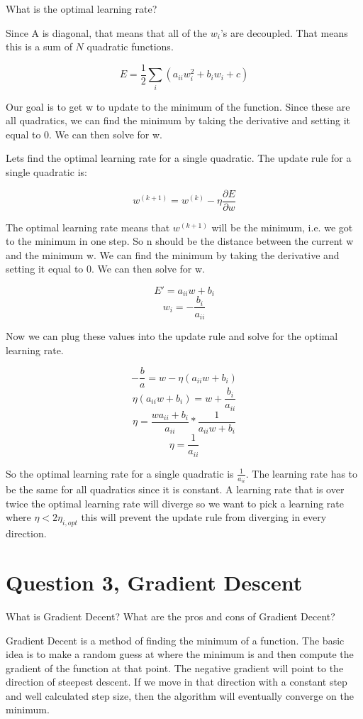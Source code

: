 \documentclass{article}
\begin{document}
What is the optimal learning rate?

Since A is diagonal, that means that all of the $w_i$'s are decoupled. That means this is a sum of $N$ quadratic functions.

$$ E = \frac{1}{2}\sum_{i}(a_{ii}w_i^2 + b_iw_i + c) $$

Our goal is to get w to update to the minimum of the function. Since these are all quadratics, we can find the minimum by taking the derivative and setting it equal to 0. We can then solve for w.

Lets find the optimal learning rate for a single quadratic. The update rule for a single quadratic is:

$$ w^{(k+1)} = w^{(k)} - \eta \frac{\partial E}{\partial w} $$

The optimal learning rate means that $w^{(k+1)}$ will be the minimum, i.e. we got to the minimum in one step. So n should be the distance between the current w and the minimum w. We can find the minimum by taking the derivative and setting it equal to 0. We can then solve for w.

$$ E' = a_{ii}w + b_i $$
$$ w_i = -\frac{b_i}{a_{ii}} $$

Now we can plug these values into the update rule and solve for the optimal learning rate.

$$ -\frac{b}{a} = w - \eta (a_{ii}w + b_{i}) $$
$$ \eta(a_{ii}w + b_{i}) = w + \frac{b_i}{a_{ii}} $$
$$ \eta = \frac{wa_{ii} + b_i}{a_{ii}} * \frac{1}{a_{ii}w + b_{i}} $$
$$ \eta = \frac{1}{a_{ii}}$$

So the optimal learning rate for a single quadratic is $\frac{1}{a_{ii}}$. The learning rate has to be the same for all quadratics since it is constant. A learning rate that is over twice the optimal learning rate will diverge so we want to pick a learning rate where $\eta < 2 \eta_{i,opt}$ this will prevent the update rule from diverging in every direction.


\section*{Question 3, Gradient Descent}

What is Gradient Decent? What are the pros and cons of Gradient Decent?

Gradient Decent is a method of finding the minimum of a function. The basic idea is to make a random guess at where the minimum is and then compute the gradient of the function at that point. The negative gradient will point to the direction of steepest descent. If we move in that direction with a constant step and well calculated step size, then the algorithm will eventually converge on the minimum.
\end{document}
